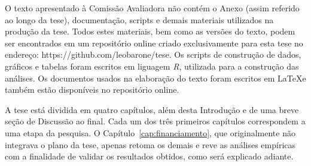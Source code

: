 O texto apresentado à Comissão Avaliadora não contém o Anexo (assim referido ao longo da tese), documentação, scripts e demais materiais utilizados na produção da tese. Todos estes materiais, bem como as versões do texto, podem ser encontrados em um repositório online criado exclusivamente para esta tese no endereço: https://github.com/leobarone/tese. Os scripts de construção de dados, gráficos e tabelas foram escritos em liguagem \emph{R}, utilizada para a construção das análises. Os documentos usados na elaboração do texto foram escritos em \LaTeX e também estão disponíveis no repositório online.

A tese está dividida em quatro capítulos, além desta Introdução e de uma breve seção de Discussão ao final. Cada um dos três primeiros capítulos correspondem a uma etapa da pesquisa. O Capítulo~\ref{cap:financiamento}, que originalmente não integrava o plano da tese, apenas retoma os demais e reve as análises empíricas com a finalidade de validar os resultados obtidos, como será explicado adiante.